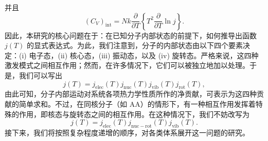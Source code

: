 并且
\begin{equation}\tag{6.5.9}\label{eq:6.5.9}
( C _ { V } ) _ { \mathrm { i n t } } = N k \frac { \partial } { \partial T } \left\{ T ^{2} \frac { \partial } { \partial T } \ln j \right\} .
\end{equation}
因此，本研究的核心问题在于：在已知分子内部状态的前提下，如何推导出函数 \(j(T)\) 的显式表达式。为此，我们注意到，分子的内部状态由以下四个要素决定：(i) 电子态，(ii) 核心态，(iii) 振动态，以及 (iv) 旋转态。严格来说，这四种激发模式之间相互作用；然而，在许多情况下，它们可以被独立地加以处理。于是，我们可以写出
\begin{equation}\tag{6.5.10}\label{eq:6.5.10}
j ( T ) = j _ { \mathrm { e l e c } } ( T ) j _ { \mathrm { n u c } } ( T ) j _ { \mathrm { v i b } } ( T ) j _ { \mathrm { r o t } } ( T ) ,
\end{equation}
由此可知，分子内部运动对系统各项热力学性质所作的净贡献，可表示为这四种贡献的简单求和。不过，在同核分子（如 AA）的情形下，有一种相互作用发挥着特殊的作用，即核态与旋转态之间的相互作用。在这种情况下，我们不妨改写为
\begin{equation}\tag{6.5.11}\label{eq:6.5.11}
j ( T ) = j _ { \mathrm { e l e c } } ( T ) j _ { \mathrm { n u c - r o t } } ( T ) j _ { \mathrm { v i b } } ( T ) .
\end{equation}
接下来，我们将按照复杂程度递增的顺序，对各类体系展开这一问题的研究。

